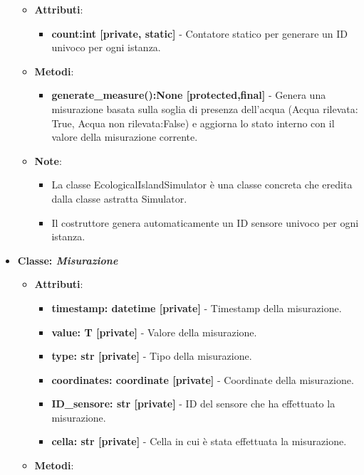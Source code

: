 \begin{itemize}
    \begin{itemize}
        \item    \textbf{Attributi}: 
    \begin{itemize}
        \item \textbf{count:int [private, static]} - Contatore statico per generare un ID univoco per ogni istanza.
    \end{itemize}
    \item    \textbf{Metodi}: 
    \begin{itemize}
        \item \textbf{generate\_measure():None [protected,final]} - Genera una misurazione basata sulla soglia di presenza dell'acqua (Acqua rilevata: True, Acqua non rilevata:False) e aggiorna lo stato interno con il valore della misurazione corrente.
    \end{itemize}
    \item    \textbf{Note}:
    \begin{itemize}
        \item La classe EcologicalIslandSimulator è una classe concreta che eredita dalla classe astratta Simulator.
        \item Il costruttore genera automaticamente un ID sensore univoco per ogni istanza.
    \end{itemize}
\end{itemize}
    \item{\textbf{Classe: \textit{Misurazione}}}
    \begin{itemize}
        \item   \textbf{Attributi}: 
    \begin{itemize}
        \item \textbf{timestamp: datetime [private]} - Timestamp della misurazione.
        \item \textbf{value: T [private]} - Valore della misurazione.
        \item \textbf{type: str [private]} - Tipo della misurazione.
        \item \textbf{coordinates: coordinate [private]} - Coordinate della misurazione.
        \item \textbf{ID\_sensore: str [private]} - ID del sensore che ha effettuato la misurazione.
        \item \textbf{cella: str [private]} - Cella in cui è stata effettuata la misurazione.
    \end{itemize}
    \item   \textbf{Metodi}: 
    \begin{itemize}

\end{itemize}
\end{itemize}
\end{itemize}
